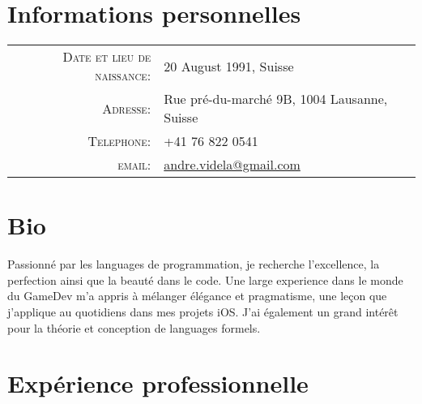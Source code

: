 \documentclass[a4paper,10pt]{article} %
\begin{document}
\pagestyle{empty} %


\par{\bigskip\par} %
\par{\bigskip\par} %
\section{Informations personnelles }

\begin{tabular}{rl}
\textsc{Date et lieu de naissance:} & 20 August 1991, Suisse \\
\textsc{Adresse:} & Rue pré-du-marché 9B, 1004 Lausanne, Suisse \\
\textsc{Telephone:} & +41 76 822 0541\\
\textsc{email:} & \href{mailto:andre.videla@gmail.com}{andre.videla@gmail.com}
\end{tabular}


\section{Bio}
Passionné par les languages de programmation, je recherche l'excellence, la perfection ainsi que la beauté dans le code. Une large experience dans le monde du GameDev m'a appris à mélanger élégance et pragmatisme, une leçon que j'applique au quotidiens dans mes projets iOS. J'ai également un grand intérêt pour la théorie et conception de languages formels.

\section{Expérience professionnelle }
\end{document}
